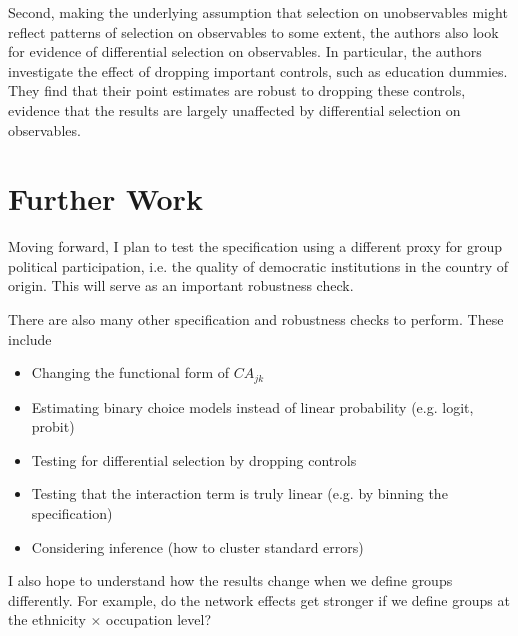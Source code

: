 \documentclass[11pt, oneside]{article}   	%
\newcommand{\lst}[1]{\begin{itemize}#1\end{itemize}}
\begin{document}
Second, making the underlying assumption that selection on unobservables might reflect patterns of selection on observables to some extent, the authors also look for evidence of differential selection on observables. In particular, the authors investigate the effect of dropping important controls, such as education dummies. They find that their point estimates are robust to dropping these controls, evidence that the results are largely unaffected by differential selection on observables.

\section{Further Work}

Moving forward, I plan to test the specification using a different proxy for group political participation, i.e. the quality of democratic institutions in the country of origin. This will serve as an important robustness check.

There are also many other specification and robustness checks to perform. These include
\lst{
	\item Changing the functional form of $CA_{jk}$
	\item Estimating binary choice models instead of linear probability (e.g. logit, probit)
	\item Testing for differential selection by dropping controls
	\item Testing that the interaction term is truly linear (e.g. by binning the specification)
	\item Considering inference (how to cluster standard errors)
} 

I also hope to understand how the results change when we define groups differently. For example, do the network effects get stronger if we define groups at the ethnicity $\times$ occupation level?

\pagebreak

\printbibliography
\end{document}
